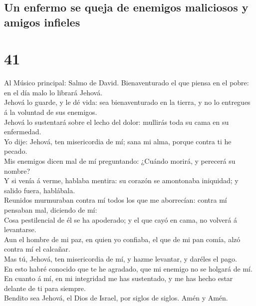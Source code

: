 \hypertarget{un-enfermo-se-queja-de-enemigos-maliciosos-y-amigos-infieles}{%
\subsection{Un enfermo se queja de enemigos maliciosos y amigos
infieles}\label{un-enfermo-se-queja-de-enemigos-maliciosos-y-amigos-infieles}}

\hypertarget{section-40}{%
\section{41}\label{section-40}}

 Al Músico principal: Salmo de David. Bienaventurado el
que piensa en el pobre: en el día malo lo librará Jehová.\\
 Jehová lo guarde, y le dé vida: sea bienaventurado en la
tierra, y no lo entregues á la voluntad de sus enemigos.\\
 Jehová lo sustentará sobre el lecho del dolor: mullirás
toda su cama en su enfermedad.\\
 Yo dije: Jehová, ten misericordia de mí; sana mi alma,
porque contra ti he pecado.\\
 Mis enemigos dicen mal de mí preguntando: ¿Cuándo morirá,
y perecerá su nombre?\\
 Y si venía á verme, hablaba mentira: su corazón se
amontonaba iniquidad; y salido fuera, hablábala.\\
 Reunidos murmuraban contra mí todos los que me
aborrecían: contra mí pensaban mal, diciendo de mí:\\
 Cosa pestilencial de él se ha apoderado; y el que cayó en
cama, no volverá á levantarse.\\
 Aun el hombre de mi paz, en quien yo confiaba, el que de
mi pan comía, alzó contra mí el calcañar.\\
 Mas tú, Jehová, ten misericordia de mí, y hazme
levantar, y daréles el pago.\\
 En esto habré conocido que te he agradado, que mi
enemigo no se holgará de mí.\\
 En cuanto á mí, en mi integridad me has sustentado, y me
has hecho estar delante de ti para siempre.\\
 Bendito sea Jehová, el Dios de Israel, por siglos de
siglos. Amén y Amén.

